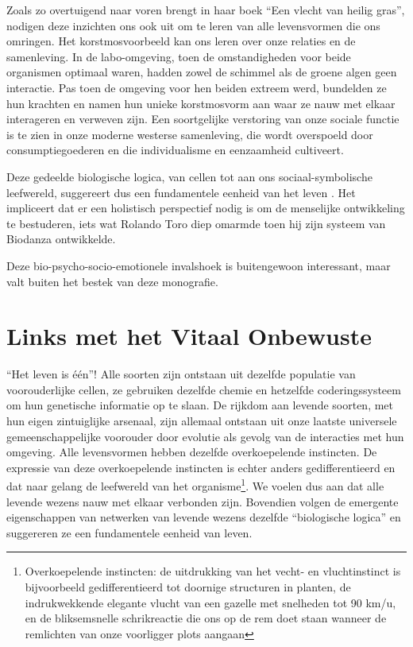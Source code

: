 \documentclass[
  11pt,
]{book}
\begin{document}
Zoals \citet{Kimmerer2013} zo overtuigend naar voren brengt in haar boek ``Een vlecht van heilig gras'', nodigen deze inzichten ons ook uit om te leren van alle levensvormen die ons omringen. Het korstmosvoorbeeld kan ons leren over onze relaties en de samenleving. In de labo-omgeving, toen de omstandigheden voor beide organismen optimaal waren, hadden zowel de schimmel als de groene algen geen interactie. Pas toen de omgeving voor hen beiden extreem werd, bundelden ze hun krachten en namen hun unieke korstmosvorm aan waar ze nauw met elkaar interageren en verweven zijn. Een soortgelijke verstoring van onze sociale functie is te zien in onze moderne westerse samenleving, die wordt overspoeld door consumptiegoederen en die individualisme en eenzaamheid cultiveert.

Deze gedeelde biologische logica, van cellen tot aan ons sociaal-symbolische leefwereld, suggereert dus een fundamentele eenheid van het leven \citep{capraLuisi2014}. Het impliceert dat er een holistisch perspectief nodig is om de menselijke ontwikkeling te bestuderen, iets wat Rolando Toro diep omarmde toen hij zijn systeem van Biodanza ontwikkelde.

Deze bio-psycho-socio-emotionele invalshoek is buitengewoon interessant, maar valt buiten het bestek van deze monografie.

\section{Links met het Vitaal Onbewuste}\label{links-met-het-vitaal-onbewuste}

``Het leven is één''! Alle soorten zijn ontstaan uit dezelfde populatie van voorouderlijke cellen, ze gebruiken dezelfde chemie en hetzelfde coderingssysteem om hun genetische informatie op te slaan. De rijkdom aan levende soorten, met hun eigen zintuiglijke arsenaal, zijn allemaal ontstaan uit onze laatste universele gemeenschappelijke voorouder door evolutie als gevolg van de interacties met hun omgeving. Alle levensvormen hebben dezelfde overkoepelende instincten. De expressie van deze overkoepelende instincten is echter anders gedifferentieerd en dat naar gelang de leefwereld van het organisme\footnote{Overkoepelende instincten: de uitdrukking van het vecht- en vluchtinstinct is bijvoorbeeld gedifferentieerd tot doornige structuren in planten, de indrukwekkende elegante vlucht van een gazelle met snelheden tot 90 km/u, en de bliksemsnelle schrikreactie die ons op de rem doet staan wanneer de remlichten van onze voorligger plots aangaan}. We voelen dus aan dat alle levende wezens nauw met elkaar verbonden zijn. Bovendien volgen de emergente eigenschappen van netwerken van levende wezens dezelfde ``biologische logica'' en suggereren ze een fundamentele eenheid van leven.
\end{document}
